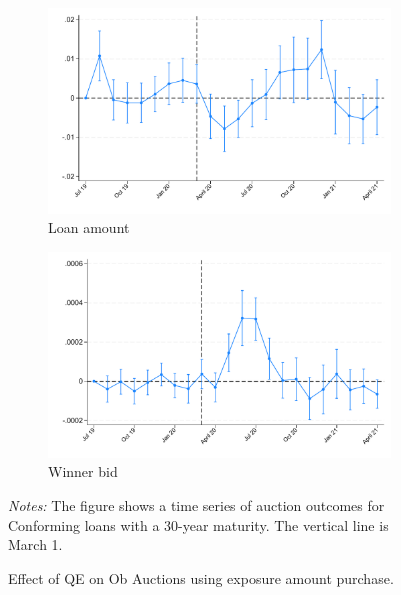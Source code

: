 \documentclass[11pt,a4paper]{article}
\begin{document}
\begin{figure}[h]
    \centering
    \begin{subfigure}[b]{0.49\textwidth}
        \includegraphics[width=0.998\textwidth]{../results/figures/did_loan_amount_expamount_march_dummy.pdf}
        \caption{ Loan amount }\label{fig:loan_amount}
       \end{subfigure}
       \begin{subfigure}[b]{0.49\textwidth}
        \includegraphics[width=0.998\textwidth]{../results/figures/did_winner_bid_expamount_march_dummy.pdf}
        \caption{ Winner bid }\label{fig:winner_bid}
       \end{subfigure}
       \caption{Effect of QE on Ob Auctions using exposure amount purchase.}\label{fig:did_exp_amount}
     \begin{minipage}{\textwidth}
        \footnotesize{\textit{Notes:} The figure shows a time series of auction outcomes for Conforming loans with a 30-year maturity. The vertical line is March 1.  } 
        \end{minipage}
  \end{figure}
  
\end{document}
